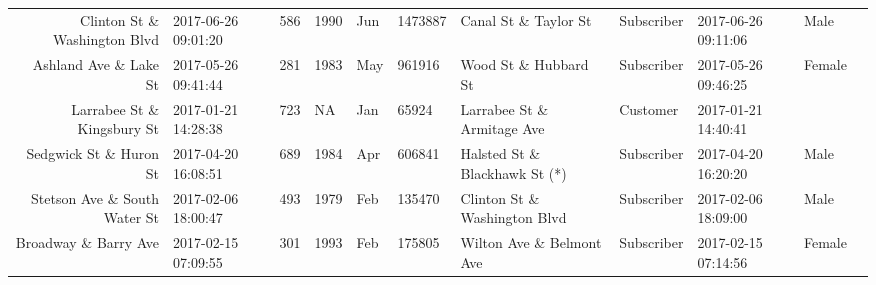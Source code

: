 \documentclass[11pt]{article}
\begin{document}
\begin{tabular}{r|llllllllll}
	 Clinton St \& Washington Blvd         & 2017-06-26 09:01:20                    &  586                                   & 1990                                   & Jun                                    & 1473887                                & Canal St \& Taylor St                 & Subscriber                             & 2017-06-26 09:11:06                    & Male                                  \\
	 Ashland Ave \& Lake St                & 2017-05-26 09:41:44                    &  281                                   & 1983                                   & May                                    &  961916                                & Wood St \& Hubbard St                 & Subscriber                             & 2017-05-26 09:46:25                    & Female                                \\
	 Larrabee St \& Kingsbury St           & 2017-01-21 14:28:38                    &  723                                   &   NA                                   & Jan                                    &   65924                                & Larrabee St \& Armitage Ave           & Customer                               & 2017-01-21 14:40:41                    &                                       \\
	 Sedgwick St \& Huron St               & 2017-04-20 16:08:51                    &  689                                   & 1984                                   & Apr                                    &  606841                                & Halsted St \& Blackhawk St (*)        & Subscriber                             & 2017-04-20 16:20:20                    & Male                                  \\
	 Stetson Ave \& South Water St         & 2017-02-06 18:00:47                    &  493                                   & 1979                                   & Feb                                    &  135470                                & Clinton St \& Washington Blvd         & Subscriber                             & 2017-02-06 18:09:00                    & Male                                  \\
	 Broadway \& Barry Ave                 & 2017-02-15 07:09:55                    &  301                                   & 1993                                   & Feb                                    &  175805                                & Wilton Ave \& Belmont Ave             & Subscriber                             & 2017-02-15 07:14:56                    & Female                                \\

\end{tabular}
\end{document}
